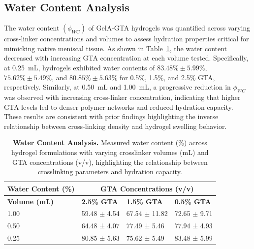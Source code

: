 \subsection{Water Content Analysis}

The water content \((\phi_{WC})\) of GelA-GTA hydrogels was quantified across varying cross-linker concentrations and volumes to assess hydration properties critical for mimicking native meniscal tissue. As shown in Table~\ref{tab:ch2_water_content}, the water content decreased with increasing GTA concentration at each volume tested. Specifically, at 0.25~mL, hydrogels exhibited water contents of \(83.48\% \pm 5.99\%\), \(75.62\% \pm 5.49\%\), and \(80.85\% \pm 5.63\%\) for 0.5\%, 1.5\%, and 2.5\% GTA, respectively. Similarly, at 0.50~mL and 1.00~mL, a progressive reduction in \(\phi_{WC}\) was observed with increasing cross-linker concentration, indicating that higher GTA levels led to denser polymer networks and reduced hydration capacity. These results are consistent with prior findings highlighting the inverse relationship between cross-linking density and hydrogel swelling behavior.

\begin{table}[H]
    \centering
    \caption[Water Content Analysis]{\textbf{Water Content Analysis.} Measured water content (\%) across hydrogel formulations with varying crosslinker volumes (mL) and GTA concentrations (v/v), highlighting the relationship between crosslinking parameters and hydration capacity.}
    \label{tab:ch2_water_content}
    \setlength{\tabcolsep}{8pt}
    \begin{tabular}{|p{2.8cm}|p{2.8cm}|p{2.8cm}|p{2.8cm}|}
        \hline
        \cellcolor{gray!20}\textbf{Water Content (\%)} & \multicolumn{3}{c|}{\cellcolor{gray!20}\textbf{GTA Concentrations (v/v)}} \\[0.3em]
        \hline
        \cellcolor{gray!20}\textbf{Volume (mL)} & \cellcolor{gray!20}\textbf{2.5\% GTA} & \cellcolor{gray!20}\textbf{1.5\% GTA} & \cellcolor{gray!20}\textbf{0.5\% GTA} \\[0.3em]
        \hline
        \cellcolor{gray!20}1.00 & 59.48 $\pm$ 4.54 & 67.54 $\pm$ 11.82 & 72.65 $\pm$ 9.71 \\[0.3em]
        \hline
        \cellcolor{gray!20}0.50 & 64.48 ± 4.07 & 77.49 ± 5.46 & 77.94 ± 4.93 \\[0.3em]
        \hline
        \cellcolor{gray!20}0.25 & 80.85 ± 5.63 & 75.62 ± 5.49 & 83.48 ± 5.99 \\[0.3em]
        \hline
    \end{tabular}
\end{table}

